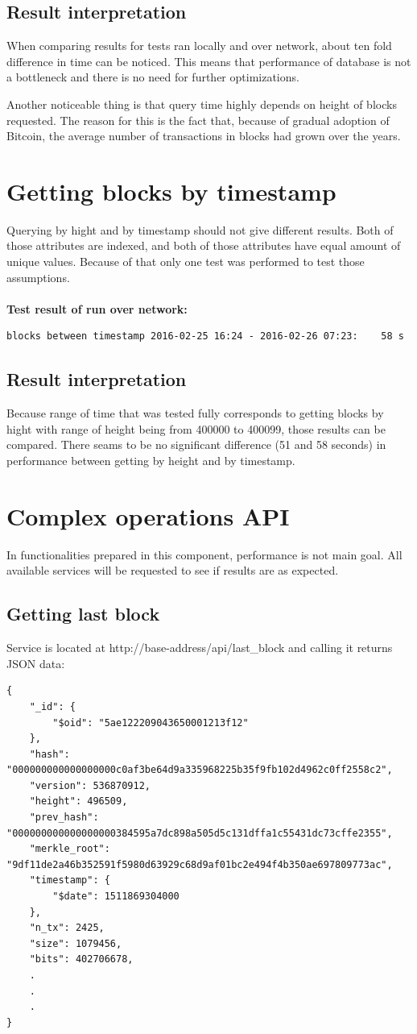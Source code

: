 \documentclass[12pt, en, eng, oneside, final]{mgr}
\begin{document}
\subsection{Result interpretation}
When comparing results for tests ran locally and over network, about ten fold difference in time can be noticed. This means that performance of database is not a bottleneck and there is no need for further optimizations.

Another noticeable thing is that query time highly depends on height of blocks requested. The reason for this is the fact that, because of gradual adoption of Bitcoin, the average number of transactions in blocks had grown over the years. 

\section{Getting blocks by timestamp}
Querying by hight and by timestamp should not give different results. Both of those attributes are indexed, and both of those attributes have equal amount of unique values. Because of that only one test was performed to test those assumptions.
\\
\\
\textbf{Test result of run over network:}
\begin{verbatim}
blocks between timestamp 2016-02-25 16:24 - 2016-02-26 07:23:    58 s
\end{verbatim}

\subsection{Result interpretation}
Because range of time that was tested fully corresponds to getting blocks by hight with range of height being from 400000 to 400099, those results can be compared. There seams to be no significant difference (51 and 58 seconds) in performance between getting by height and by timestamp.

\section{Complex operations API}
In functionalities prepared in this component, performance is not main goal. All available services will be requested to see if results are as expected.

\subsection{Getting last block}
Service is located at http://base-address/api/last\_block and calling it returns JSON data:
\begin{verbatim}
{
    "_id": {
        "$oid": "5ae122209043650001213f12"
    },
    "hash": "000000000000000000c0af3be64d9a335968225b35f9fb102d4962c0ff2558c2",
    "version": 536870912,
    "height": 496509,
    "prev_hash": "000000000000000000384595a7dc898a505d5c131dffa1c55431dc73cffe2355",
    "merkle_root": "9df11de2a46b352591f5980d63929c68d9af01bc2e494f4b350ae697809773ac",
    "timestamp": {
        "$date": 1511869304000
    },
    "n_tx": 2425,
    "size": 1079456,
    "bits": 402706678,
    .
    .
    .
}
\end{verbatim}
\end{document}
